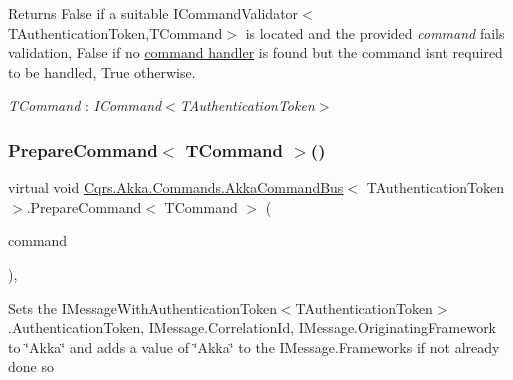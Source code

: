 \begin{DoxyReturn}{Returns}
False if a suitable I\+Command\+Validator$<$\+T\+Authentication\+Token,\+T\+Command$>$ is located and the provided {\itshape command}  fails validation, False if no \hyperlink{}{command handler} is found but the command isn\textquotesingle{}t required to be handled, True otherwise. 
\end{DoxyReturn}
\begin{Desc}
\item[Type Constraints]\begin{description}
\item[{\em T\+Command} : {\em I\+Command$<$T\+Authentication\+Token$>$}]\end{description}
\end{Desc}
\mbox{\label{classCqrs_1_1Akka_1_1Commands_1_1AkkaCommandBus_a9755a84c0b971ce0862abdc2783422ce_a9755a84c0b971ce0862abdc2783422ce}} 
\subsubsection{\texorpdfstring{Prepare\+Command$<$ T\+Command $>$()}{PrepareCommand< TCommand >()}}
{\footnotesize\ttfamily virtual void \hyperlink{classCqrs_1_1Akka_1_1Commands_1_1AkkaCommandBus}{Cqrs.\+Akka.\+Commands.\+Akka\+Command\+Bus}$<$ T\+Authentication\+Token $>$.Prepare\+Command$<$ T\+Command $>$ (\begin{DoxyParamCaption}\item[{T\+Command}]{command }\end{DoxyParamCaption})\hspace{0.3cm}{\ttfamily [protected]}, {\ttfamily [virtual]}}



Sets the I\+Message\+With\+Authentication\+Token$<$\+T\+Authentication\+Token$>$.\+Authentication\+Token, I\+Message.\+Correlation\+Id, I\+Message.\+Originating\+Framework to \char`\"{}\+Akka\char`\"{} and adds a value of \char`\"{}\+Akka\char`\"{} to the I\+Message.\+Frameworks if not already done so 

